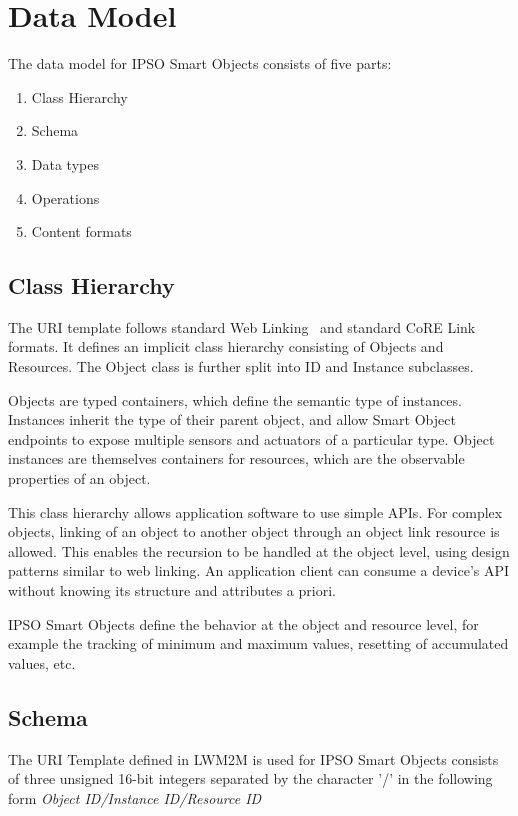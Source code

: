 \documentclass[peerreview, a4paper, 7pt]{IEEEtran}
\begin{document}
\section{Data Model} 

The data model for IPSO Smart Objects consists of five parts:

\begin{enumerate}
\item Class Hierarchy
\item Schema
\item Data types 
\item Operations 
\item Content formats
\end{enumerate}

\subsection{Class Hierarchy}

The URI template follows standard Web Linking~\cite{rfc5988} and standard CoRE Link~\cite{rfc6690} formats. It defines an implicit class hierarchy consisting of Objects and Resources. The Object class is further split into ID and Instance subclasses. 

Objects are typed containers, which define the semantic type of instances. Instances inherit the type of their parent object, and allow Smart Object endpoints to expose multiple sensors and actuators of a particular type. Object instances are themselves containers for resources, which are the observable properties of an object. 

This class hierarchy allows application software to use simple APIs. For complex objects, linking of an object to another object through an object link resource is allowed. This enables the recursion to be handled at the object level, using design patterns similar to web linking. An application client can consume a device's API without knowing its structure and attributes a priori.

IPSO Smart Objects define the behavior at the object and resource level, for example the tracking of minimum and maximum values, resetting of accumulated values, etc.

\subsection{Schema}

The URI Template defined in LWM2M is used for IPSO Smart Objects consists of three unsigned 16-bit integers separated by the character '/' in the following form \textit{Object ID/Instance ID/Resource ID}
\end{document}
